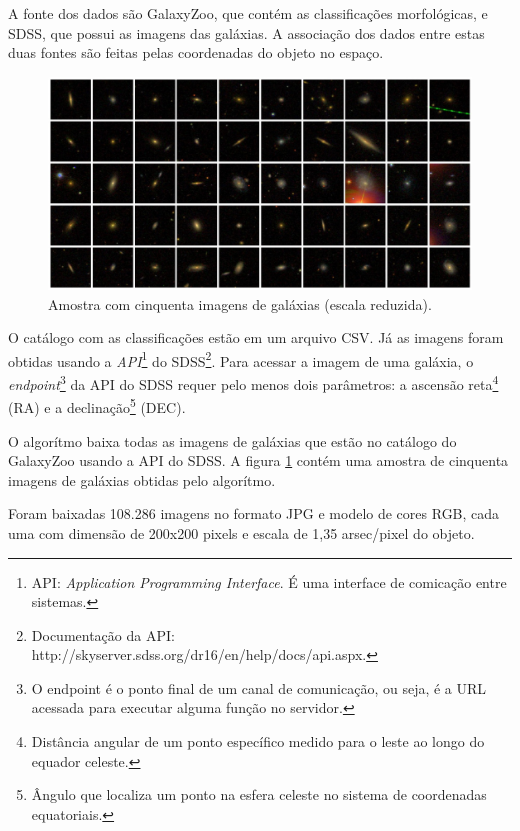 A fonte dos dados são GalaxyZoo, que contém as classificações morfológicas, e SDSS, que possui as imagens das galáxias. A associação dos dados entre estas duas fontes são feitas pelas coordenadas do objeto no espaço.

\begin{figure}[h!]
  \centering
  \includegraphics[width=\textwidth]{figures/galaxy_grid.jpg}
  \caption{Amostra com cinquenta imagens de galáxias (escala reduzida).}
  \label{fig:galaxy_grid}
\end{figure}

O catálogo com as classificações estão em um arquivo CSV. Já as imagens foram obtidas usando a \emph{API}\footnote{API: \emph{Application Programming Interface}. É uma interface de comicação entre sistemas.} do SDSS\footnote{Documentação da API: http://skyserver.sdss.org/dr16/en/help/docs/api.aspx.}. Para acessar a imagem de uma galáxia, o \emph{endpoint}\footnote{O endpoint é o ponto final de um canal de comunicação, ou seja, é a URL acessada para executar alguma função no servidor.} da API do SDSS requer pelo menos dois parâmetros: a ascensão reta\footnote{Distância angular de um ponto específico medido para o leste ao longo do equador celeste.} (RA) e a declinação\footnote{Ângulo que localiza um ponto na esfera celeste no sistema de coordenadas equatoriais.} (DEC).

O algorítmo\cite{cardoso2020} baixa todas as imagens de galáxias que estão no catálogo do GalaxyZoo usando a API do SDSS. A figura \ref{fig:galaxy_grid} contém uma amostra de cinquenta imagens de galáxias obtidas pelo algorítmo.

Foram baixadas 108.286 imagens no formato JPG e modelo de cores RGB, cada uma com dimensão de 200x200 pixels e escala de 1,35 arsec/pixel do objeto.

